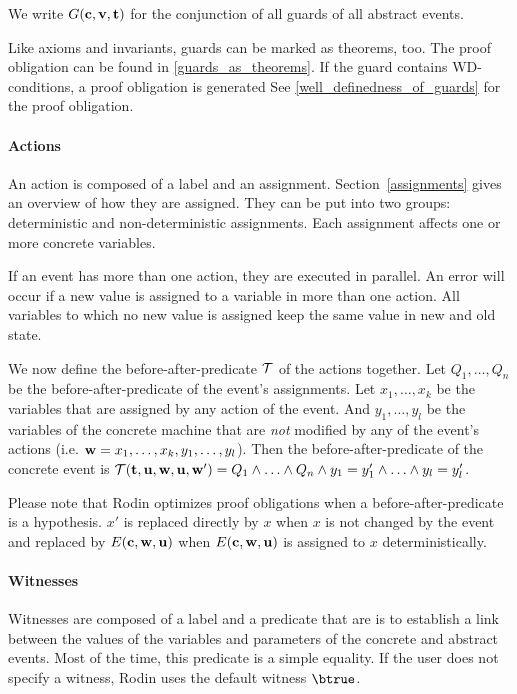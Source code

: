 We write $G(\mathbf{c},\mathbf{v},\mathbf{t})$ for the conjunction of all guards of all abstract events.

Like axioms and invariants, guards can be marked as theorems, too. 
The proof obligation can be found in \ref{guards_as_theorems}.
If the guard contains WD-conditions, a proof obligation is generated
See \ref{well_definedness_of_guards} for the proof obligation.

\paragraph{Actions}
\label{actions}
An action is composed of a label and an assignment.
Section~\ref{assignments} gives an overview of how they are assigned.
They can be put into two groups: deterministic and non-deterministic assignments.
Each assignment affects one or more concrete variables.

If an event has more than one action, they are executed in parallel. 
An error will occur if a new value is assigned to a variable in more than one action.
All variables to which no new value is assigned keep the same value in new and old state.

We now define the before-after-predicate $\mathcal{T}$ of the actions together.
Let $Q_1,\ldots,Q_n$ be the before-after-predicate of the event's assignments. 
Let $x_1,\ldots,x_k$ be the variables that are assigned by any action of the event.
And $y_1,\ldots,y_l$ be the variables of the concrete machine that are \emph{not} modified by any of 
 the event's actions (i.e. $\mathbf{w} = x_1,\ldots,x_k,y_1,\ldots,y_l$).
Then the before-after-predicate of the concrete event is 
  $\mathcal{T}({\mathbf{t},\mathbf{u}},\mathbf{w},\mathbf{u},\mathbf{w}') = Q_1 \land \ldots \land Q_n \land y_1 = y_1' \land \ldots \land y_l=y_l'$.

Please note that Rodin optimizes proof obligations when a before-after-predicate is a hypothesis.
$x'$ is replaced directly by $x$ when $x$ is not changed by the event and replaced by $E(\mathbf{c},\mathbf{w},\mathbf{u})$
 when $E(\mathbf{c},\mathbf{w},\mathbf{u})$ is assigned to $x$ deterministically.

\paragraph{Witnesses}
\label{witness}

Witnesses are composed of a label and a predicate that are is to establish a link between the values 
  of the variables and parameters of the concrete and abstract events.
Most of the time, this predicate is a simple equality.
If the user does not specify a witness, Rodin uses the default witness $\btrue$.

